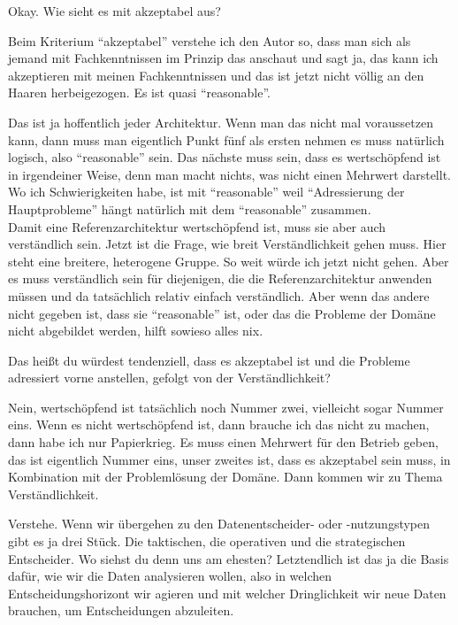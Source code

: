 \PA	 Okay. Wie sieht es mit akzeptabel aus?

\LF	Beim Kriterium \enquote{akzeptabel} verstehe ich den Autor so, dass man sich als jemand mit Fachkenntnissen im Prinzip das anschaut und sagt ja, das kann ich akzeptieren mit meinen Fachkenntnissen und das ist jetzt nicht völlig an den Haaren herbeigezogen. Es ist quasi \enquote{reasonable}.

\PA	Das ist ja hoffentlich jeder Architektur. Wenn man das nicht mal voraussetzen kann, dann muss man eigentlich Punkt fünf als ersten nehmen es muss natürlich logisch, also \enquote{reasonable} sein. Das nächste muss sein, dass es wertschöpfend ist in irgendeiner Weise, denn man macht nichts, was nicht einen Mehrwert darstellt. Wo ich Schwierigkeiten habe, ist mit \enquote{reasonable}  weil \enquote{Adressierung der Hauptprobleme} hängt natürlich mit dem \enquote{reasonable} zusammen.\\
Damit eine Referenzarchitektur wertschöpfend ist, muss sie aber auch verständlich sein. Jetzt ist die Frage, wie breit Verständlichkeit gehen muss. Hier steht eine breitere, heterogene Gruppe. So weit würde ich jetzt nicht gehen. Aber es muss verständlich sein für diejenigen, die die Referenzarchitektur anwenden müssen und da tatsächlich relativ einfach verständlich. Aber wenn das andere nicht gegeben ist, dass sie \enquote{reasonable} ist, oder das die Probleme der Domäne nicht abgebildet werden, hilft sowieso alles nix.

\LF	 Das heißt du würdest tendenziell, dass es akzeptabel ist und die Probleme adressiert vorne anstellen, gefolgt von der Verständlichkeit?

\PA	 Nein, wertschöpfend ist tatsächlich noch Nummer zwei, vielleicht sogar Nummer eins. Wenn es nicht wertschöpfend ist, dann brauche ich das nicht zu machen, dann habe ich nur Papierkrieg. Es muss einen Mehrwert für den Betrieb geben, das ist eigentlich Nummer eins, unser zweites ist, dass es akzeptabel sein muss, in Kombination mit der Problemlösung der Domäne. Dann kommen wir zu Thema Verständlichkeit.

\LF	 Verstehe. Wenn wir übergehen zu den Datenentscheider- oder -nutzungstypen gibt es ja drei Stück.  Die taktischen, die operativen und die strategischen Entscheider. Wo siehst du denn uns am ehesten? Letztendlich ist das ja die Basis dafür, wie wir die Daten analysieren wollen, also in welchen Entscheidungshorizont wir agieren und mit welcher Dringlichkeit wir neue Daten brauchen, um Entscheidungen abzuleiten.

